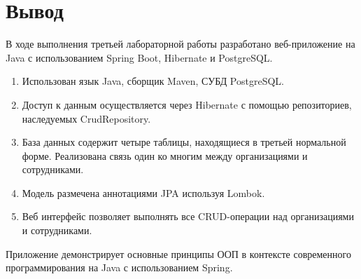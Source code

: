 \documentclass[oneside,a4paper,14pt]{extarticle}
\begin{document}
\newpage

\section*{Вывод}

В ходе выполнения третьей лабораторной работы разработано веб-приложение на Java с использованием Spring Boot, Hibernate и PostgreSQL.

\begin{enumerate}
    \item Использован язык Java, сборщик Maven, СУБД PostgreSQL.
    \item Доступ к данным осуществляется через Hibernate  с помощью репозиториев, наследуемых CrudRepository.
    \item База данных содержит четыре таблицы, находящиеся в третьей нормальной форме. Реализована связь один ко многим между организациями и сотрудниками.
    \item Модель размечена аннотациями JPA используя Lombok.
    \item Веб интерфейс позволяет выполнять все CRUD-операции над организациями и сотрудниками.
\end{enumerate}

Приложение демонстрирует основные принципы ООП в контексте современного программирования на Java с использованием Spring.
\end{document}
